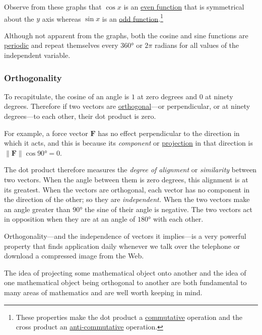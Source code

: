 \documentclass[
  a4paper,
]{article}
\begin{document}
Observe from these graphs that \(\cos x\) is an
\href{https://mathworld.wolfram.com/EvenFunction.html}{even function}
that is symmetrical about the \(y\) axis whereas \(\sin x\) is an
\href{https://mathworld.wolfram.com/OddFunction.html}{odd
function}.\footnote{These properties make the dot product a
  \href{https://mathworld.wolfram.com/Commutative.html}{commutative}
  operation and the cross product an
  \href{https://mathworld.wolfram.com/Anticommutative.html}{anti-commutative}
  operation.}

Although not apparent from the graphs, both the cosine and sine
functions are
\href{https://mathworld.wolfram.com/PeriodicFunction.html}{periodic} and
repeat themselves every \(360°\) or \(2\pi\) radians for all values of
the independent variable.

\hypertarget{orthogonality}{%
\subsubsection{Orthogonality}\label{orthogonality}}

To recapitulate, the cosine of an angle is \(1\) at zero degrees and
\(0\) at ninety degrees. Therefore if two vectors are
\href{https://mathworld.wolfram.com/Orthogonal.html}{orthogonal}---or
perpendicular, or at ninety degrees---to each other, their dot product
is zero.

For example, a force vector \(\mathbf{F}\) has no effect perpendicular
to the direction in which it acts, and this is because its
\emph{component} or
\href{https://en.wikipedia.org/wiki/Vector_projection}{projection} in
that direction is \(\lVert\mathbf{F}\rVert\cos 90° = 0\).

The dot product therefore measures the \emph{degree of alignment} or
\emph{similarity} between two vectors. When the angle between them is
zero degrees, this alignment is at its greatest. When the vectors are
orthogonal, each vector has no component in the direction of the other;
so they are \emph{independent.} When the two vectors make an angle
greater than \(90°\) the sine of their angle is negative. The two
vectors act in opposition when they are at an angle of \(180°\) with
each other.

Orthogonality---and the independence of vectors it implies---is a very
powerful property that finds application daily whenever we talk over the
telephone or download a compressed image from the Web.

The idea of projecting some mathematical object onto another and the
idea of one mathematical object being orthogonal to another are both
fundamental to many areas of mathematics and are well worth keeping in
mind.
\end{document}
